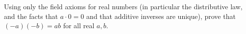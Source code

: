 Using only the field axioms for real numbers (in particular the distributive law, and the facts that $a\cdot0=0$ and that additive inverses are unique), prove that $(-a)(-b)=ab$ for all real $a,b$.
